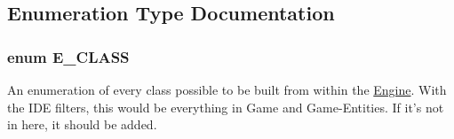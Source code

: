 \subsection{Enumeration Type Documentation}
\subsubsection[{E\-\_\-\-C\-L\-A\-S\-S}]{\setlength{\rightskip}{0pt plus 5cm}enum {\bf E\-\_\-\-C\-L\-A\-S\-S}}\label{_engine_8h_ab1adc9d93c99be93f3e5394277110aa9}
An enumeration of every class possible to be built from within the \hyperlink{class_engine}{Engine}. With the I\-D\-E filters, this would be everything in Game and Game-\/\-Entities. If it's not in here, it should be added.

